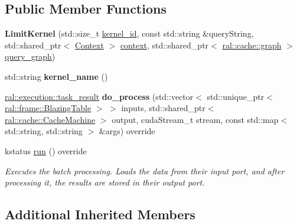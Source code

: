 \subsection*{Public Member Functions}
\begin{DoxyCompactItemize}
\item 
\mbox{\label{classral_1_1batch_1_1LimitKernel_ac7d971926879c178bfb5d124db9d34bc}} 
{\bfseries Limit\+Kernel} (std\+::size\+\_\+t \hyperlink{classral_1_1cache_1_1kernel_a2fd708656cb056a41ec635b8bdc4acfe}{kernel\+\_\+id}, const std\+::string \&query\+String, std\+::shared\+\_\+ptr$<$ \hyperlink{classblazingdb_1_1manager_1_1Context}{Context} $>$ \hyperlink{classral_1_1cache_1_1kernel_af0347d14d678cfa7205c1387746a2e1b}{context}, std\+::shared\+\_\+ptr$<$ \hyperlink{classral_1_1cache_1_1graph}{ral\+::cache\+::graph} $>$ \hyperlink{classral_1_1cache_1_1kernel_a5fbb02292aff165a28ef25e75f0d89bd}{query\+\_\+graph})
\item 
\mbox{\label{classral_1_1batch_1_1LimitKernel_a09d296c9a419f443e5b19452ac5bf76f}} 
std\+::string {\bfseries kernel\+\_\+name} ()
\item 
\mbox{\label{classral_1_1batch_1_1LimitKernel_acf03ad936313631687d9332436211e0a}} 
\hyperlink{structral_1_1execution_1_1task__result}{ral\+::execution\+::task\+\_\+result} {\bfseries do\+\_\+process} (std\+::vector$<$ std\+::unique\+\_\+ptr$<$ \hyperlink{classral_1_1frame_1_1BlazingTable}{ral\+::frame\+::\+Blazing\+Table} $>$ $>$ inputs, std\+::shared\+\_\+ptr$<$ \hyperlink{classral_1_1cache_1_1CacheMachine}{ral\+::cache\+::\+Cache\+Machine} $>$ output, cuda\+Stream\+\_\+t stream, const std\+::map$<$ std\+::string, std\+::string $>$ \&args) override
\item 
kstatus \hyperlink{classral_1_1batch_1_1LimitKernel_a154ab2ef98ef7be11d3ba6c8dc6db06d}{run} () override
\begin{DoxyCompactList}\small\item\em Executes the batch processing. Loads the data from their input port, and after processing it, the results are stored in their output port. \end{DoxyCompactList}\end{DoxyCompactItemize}
\subsection*{Additional Inherited Members}


